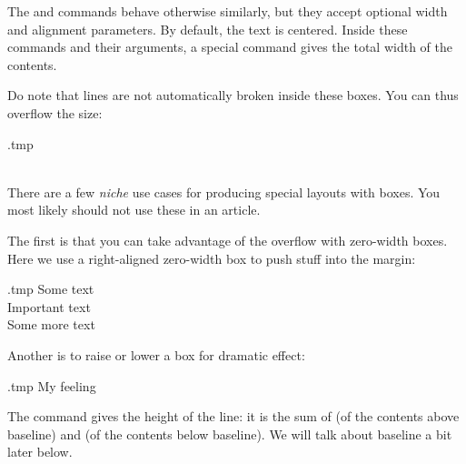 The  and  commands behave otherwise similarly,
but they accept optional width and alignment parameters.
By default, the text is centered.
Inside these commands and their arguments,
a special  command gives the total width of the contents.

Do note that lines are not automatically broken inside these boxes.
You can thus overflow the size:
%
\begin{VerbatimOut}{\jobname.tmp}
\\
\\
\end{VerbatimOut}
\ShowExample

\begin{technote}
There are a few \emph{niche} use cases for producing special layouts with boxes.
You most likely should not use these in an article.

The first is that you can take advantage of the overflow with zero-width boxes.
Here we use a right-aligned zero-width box to push stuff into the margin:
%
\begin{VerbatimOut}{\jobname.tmp}
Some text\\
\makebox[0pt][r]{(!) }Important text\\
Some more text
\end{VerbatimOut}
\ShowExample

Another is to raise or lower a box for dramatic effect:
%
\begin{VerbatimOut}{\jobname.tmp}
My feeling 
\end{VerbatimOut}
\ShowExample
%
The  command gives the height of the line:
it is the sum of  (of the contents above baseline)
and  (of the contents below baseline).
We will talk about baseline a bit later below.
\end{technote}



